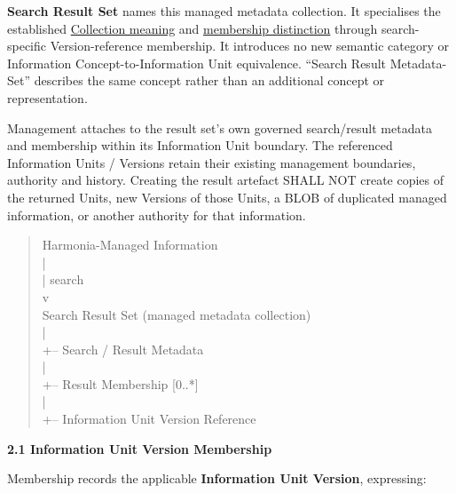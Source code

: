 \textbf{Search Result Set} names this managed metadata collection. It specialises
the established \href{\detokenize{../../../../../../../../docs/markdown/04-information-architecture/metamodel/information-architecture-metamodel.md#21-semantic-classifications}}{Collection meaning}
and \href{\detokenize{../../../../../../../../docs/markdown/04-information-architecture/patterns/containment-and-collections.md#3-collections-vs-containment-distinct-semantics}}{membership distinction}
through search-specific Version-reference membership. It introduces no new
semantic category or Information Concept-to-Information Unit equivalence.
“Search Result Metadata-Set” describes the same concept rather than an
additional concept or representation.



Management attaches to the result set's own governed search/result metadata
and membership within its Information Unit boundary. The referenced
Information Units / Versions retain their existing management boundaries,
authority and history. Creating the result artefact SHALL NOT create copies
of the returned Units, new Versions of those Units, a BLOB of duplicated
managed information, or another authority for that information.



\begin{quote}\small\ttfamily
Harmonia-Managed Information\\
        |\\
        | search\\
        v\\
Search Result Set (managed metadata collection)\\
        |\\
        +-- Search / Result Metadata\\
        |\\
        +-- Result Membership [0..*]\\
                |\\
                +-- Information Unit Version Reference\\

\end{quote}


\par\medskip\textbf{2.1 Information Unit Version Membership}\par


Membership records the applicable \textbf{Information Unit Version}, expressing:



